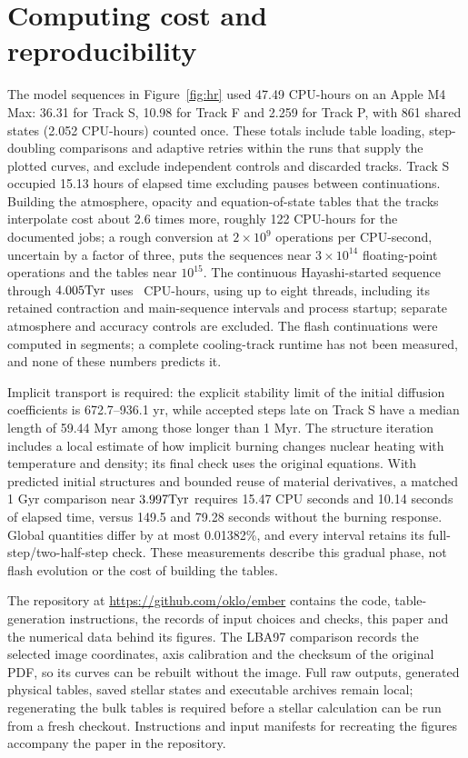 \section{Computing cost and reproducibility}\label{sec:computing}
The model sequences in Figure~\ref{fig:hr} used 47.49 CPU-hours on an
Apple M4 Max: 36.31 for Track S, 10.98 for Track F and 2.259 for Track P,
with 861 shared states (2.052 CPU-hours) counted once. These totals include
table loading, step-doubling comparisons and adaptive retries within the runs
that supply the plotted curves, and exclude independent controls and
discarded tracks. Track S occupied 15.13 hours of elapsed time excluding
pauses between continuations. Building the atmosphere, opacity and
equation-of-state tables that the tracks interpolate cost about 2.6 times
more, roughly 122 CPU-hours for the documented jobs; a rough conversion at
$2\times10^9$ operations per CPU-second, uncertain by a factor of three,
puts the sequences near $3\times10^{14}$ floating-point operations and the
tables near $10^{15}$. The continuous
Hayashi-started sequence through $4.005\mathrm{Tyr}$ uses
\continuousCPUHours\ CPU-hours, using up to eight threads, including its retained
contraction and main-sequence intervals and process startup; separate
atmosphere and accuracy controls are excluded. The flash continuations were computed in segments; a complete
cooling-track runtime has not been measured, and none of these numbers
predicts it.

Implicit transport is required: the explicit stability limit of the initial
diffusion coefficients is 672.7--936.1 yr, while accepted steps late on
Track S have a median length of 59.44 Myr among those longer than 1 Myr.
The structure iteration includes a local estimate of how implicit burning
changes nuclear heating with temperature and density; its final check uses
the original equations. With predicted initial structures and bounded reuse
of material derivatives, a matched 1 Gyr comparison near $3.997\mathrm{Tyr}$
requires 15.47 CPU seconds and 10.14 seconds of elapsed time, versus 149.5
and 79.28 seconds without the burning response. Global quantities differ
by at most 0.01382\%, and every interval retains its full-step/two-half-step
check. These measurements describe this gradual phase, not flash evolution
or the cost of building the tables.

The repository at \url{https://github.com/oklo/ember} contains the code,
table-generation instructions, the records of input choices and checks,
this paper and the numerical data behind its figures. The LBA97 comparison
records the selected image coordinates, axis calibration and the checksum of
the original PDF, so its curves can be rebuilt without the image. Full raw
outputs, generated physical tables, saved stellar states and executable
archives remain local; regenerating the bulk tables is required before a
stellar calculation can be run from a fresh checkout. Instructions and input manifests for recreating the figures accompany the
paper in the repository.
